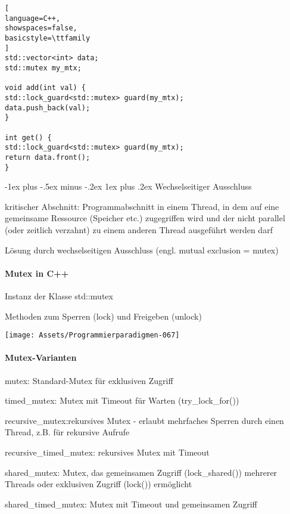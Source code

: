 \documentclass[10pt]{article}
\makeatletter
\renewcommand{\subsubsection}{\@startsection{subsubsection}{3}{0mm}%
                                {-1ex plus -.5ex minus -.2ex}%
                                {1ex plus .2ex}%
                                {\normalfont\small\bfseries}}
\makeatother
\begin{document}
\begin{lstlisting}[
language=C++,
showspaces=false,
basicstyle=\ttfamily
]
std::vector<int> data;
std::mutex my_mtx;

void add(int val) {
std::lock_guard<std::mutex> guard(my_mtx);
data.push_back(val);
}

int get() {
std::lock_guard<std::mutex> guard(my_mtx);
return data.front();
}
\end{lstlisting}


\subsubsection{Wechselseitiger Ausschluss}
\begin{itemize*}
  \item \color{orange} kritischer Abschnitt\color{black}: Programmabschnitt in einem Thread, in dem auf eine gemeinsame Ressource (Speicher etc.) zugegriffen wird und der nicht parallel (oder zeitlich verzahnt) zu einem anderen Thread ausgeführt werden darf
  \item Lösung durch \color{orange} wechselseitigen Ausschluss \color{black} (engl. mutual exclusion = mutex)
\end{itemize*}

\paragraph{Mutex in C++}
\begin{itemize*}
  \item Instanz der Klasse std::mutex
  \item Methoden zum Sperren (lock) und Freigeben (unlock)
\end{itemize*}
\begin{center}
  \texttt{[image: Assets/Programmierparadigmen-067]}
\end{center}

\paragraph{Mutex-Varianten}
\begin{itemize*}
  \item mutex: Standard-Mutex für exklusiven Zugriff
  \item timed\_mutex: Mutex mit Timeout für Warten (try\_lock\_for())
  \item recursive\_mutex:rekursives Mutex - erlaubt mehrfaches Sperren durch einen Thread, z.B. für rekursive Aufrufe
  \item recursive\_timed\_mutex: rekursives Mutex mit Timeout
  \item shared\_mutex: Mutex, das gemeinsamen Zugriff (lock\_shared()) mehrerer Threads oder exklusiven Zugriff (lock()) ermöglicht
  \item shared\_timed\_mutex: Mutex mit Timeout und gemeinsamen Zugriff
\end{itemize*}
\end{document}
